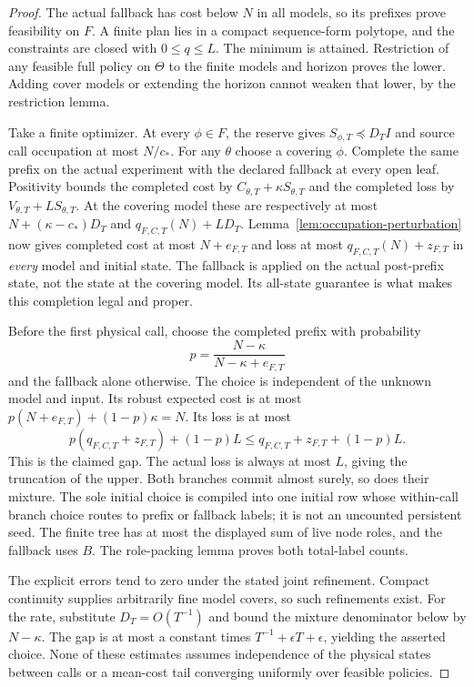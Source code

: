 \begin{proof}
The actual fallback has cost below $N$ in all models, so its prefixes prove feasibility on $F$. A finite plan lies in a compact sequence-form polytope, and the constraints are closed with $0\le q\le L$. The minimum is attained. Restriction of any feasible full policy on $\Theta$ to the finite models and horizon proves the lower. Adding cover models or extending the horizon cannot weaken that lower, by the restriction lemma.

Take a finite optimizer. At every $\phi\in F$, the reserve gives $S_{\phi,T}\preccurlyeq D_TI$ and source call occupation at most $N/c_*$. For any $\theta$ choose a covering $\phi$. Complete the same prefix on the actual experiment with the declared fallback at every open leaf. Positivity bounds the completed cost by $C_{\theta,T}+\kappa S_{\theta,T}$ and the completed loss by $V_{\theta,T}+LS_{\theta,T}$. At the covering model these are respectively at most $N+(\kappa-c_*)D_T$ and $q_{F,C,T}(N)+LD_T$. Lemma~\ref{lem:occupation-perturbation} now gives completed cost at most $N+e_{F,T}$ and loss at most $q_{F,C,T}(N)+z_{F,T}$ in \emph{every} model and initial state. The fallback is applied on the actual post-prefix state, not the state at the covering model. Its all-state guarantee is what makes this completion legal and proper.

Before the first physical call, choose the completed prefix with probability
\[
 p=\frac{N-\kappa}{N-\kappa+e_{F,T}}
\]
and the fallback alone otherwise. The choice is independent of the unknown model and input. Its robust expected cost is at most $p(N+e_{F,T})+(1-p)\kappa=N$. Its loss is at most
\[
 p(q_{F,C,T}+z_{F,T})+(1-p)L
       \le q_{F,C,T}+z_{F,T}+(1-p)L.
\]
This is the claimed gap. The actual loss is always at most $L$, giving the truncation of the upper. Both branches commit almost surely, so does their mixture. The sole initial choice is compiled into one initial row whose within-call branch choice routes to prefix or fallback labels; it is not an uncounted persistent seed. The finite tree has at most the displayed sum of live node roles, and the fallback uses $B$. The role-packing lemma proves both total-label counts.

The explicit errors tend to zero under the stated joint refinement. Compact continuity supplies arbitrarily fine model covers, so such refinements exist. For the rate, substitute $D_T=O(T^{-1})$ and bound the mixture denominator below by $N-\kappa$. The gap is at most a constant times $T^{-1}+\epsilon T+\epsilon$, yielding the asserted choice. None of these estimates assumes independence of the physical states between calls or a mean-cost tail converging uniformly over feasible policies.
\end{proof}

